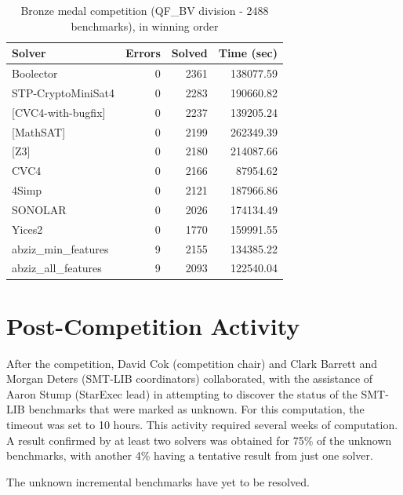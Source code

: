\documentclass[twoside,11pt]{article}
\begin{document}
\begin{table}
\centering
\begin{tabular}{|l|rrr|}
\hline
 Solver & Errors & Solved & Time (sec)\\
\hline
Boolector &	0  &		2361  &		138077.59 \\
STP-CryptoMiniSat4 & 0  &		2283  &		190660.82 	\\
{[}CVC4-with-bugfix] &	0  &		2237 	 &		139205.24 \\
{[}MathSAT]  &	0  &		2199 	 &		262349.39 \\
{[}Z3]  & 	0  &		2180 	 &		214087.66 	\\
CVC4  &	0  &		2166 	 &		87954.62 	\\
4Simp &	0 &	2121 	 &		187966.86 \\
SONOLAR &	0  &		2026  &	 	174134.49 \\
Yices2 &	0  &		1770  &	 	159991.55 \\
abziz\_min\_features &	9  &		2155 	 &	 	134385.22 \\
abziz\_all\_features &	9  &		2093 	 &	 	122540.04 \\
\hline
\end{tabular}
\vspace{.2in}
\caption{Bronze medal competition (QF\_BV division - 2488 benchmarks), in winning order}
\label{Table:bronze}
\end{table}

\section{Post-Competition Activity}
\label{sec:post}

After the competition, David Cok (competition chair) and Clark Barrett and Morgan Deters (SMT-LIB coordinators) collaborated, with the assistance of Aaron Stump (StarExec lead) in attempting to discover the status of the SMT-LIB benchmarks that were marked as unknown. For this computation, the timeout was set to 10 hours. This activity required several weeks of computation. A result confirmed by at least two solvers was obtained for 75\% of the unknown benchmarks, with another 4\% having a tentative result from just one solver.

The unknown incremental benchmarks have yet to be resolved.
\end{document}
